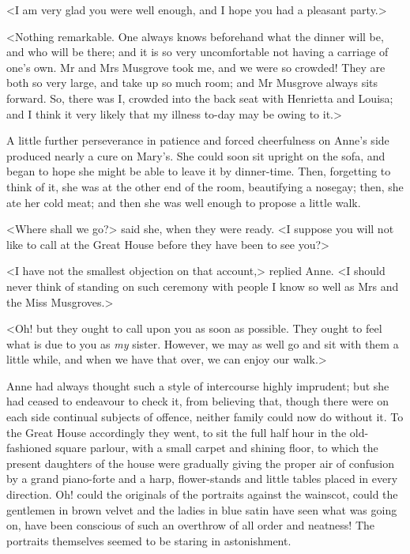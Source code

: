 <I am very glad you were well enough, and I hope you had a pleasant party.>

<Nothing remarkable. One always knows beforehand what the dinner will be, and who will be there; and it is so very uncomfortable not having a carriage of one's own. Mr and Mrs Musgrove took me, and we were so crowded! They are both so very large, and take up so much room; and Mr Musgrove always sits forward. So, there was I, crowded into the back seat with Henrietta and Louisa; and I think it very likely that my illness to-day may be owing to it.>

A little further perseverance in patience and forced cheerfulness on Anne's side produced nearly a cure on Mary's. She could soon sit upright on the sofa, and began to hope she might be able to leave it by dinner-time. Then, forgetting to think of it, she was at the other end of the room, beautifying a nosegay; then, she ate her cold meat; and then she was well enough to propose a little walk.

<Where shall we go?> said she, when they were ready. <I suppose you will not like to call at the Great House before they have been to see you?>

<I have not the smallest objection on that account,> replied Anne. <I should never think of standing on such ceremony with people I know so well as Mrs and the Miss Musgroves.>

<Oh! but they ought to call upon you as soon as possible. They ought to feel what is due to you as \textit{my} sister. However, we may as well go and sit with them a little while, and when we have that over, we can enjoy our walk.>

Anne had always thought such a style of intercourse highly imprudent; but she had ceased to endeavour to check it, from believing that, though there were on each side continual subjects of offence, neither family could now do without it. To the Great House accordingly they went, to sit the full half hour in the old-fashioned square parlour, with a small carpet and shining floor, to which the present daughters of the house were gradually giving the proper air of confusion by a grand piano-forte and a harp, flower-stands and little tables placed in every direction. Oh! could the originals of the portraits against the wainscot, could the gentlemen in brown velvet and the ladies in blue satin have seen what was going on, have been conscious of such an overthrow of all order and neatness! The portraits themselves seemed to be staring in astonishment.

